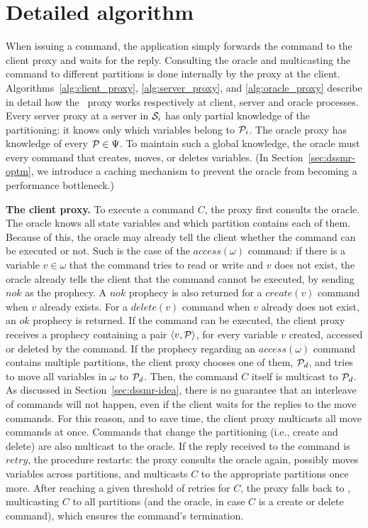 \section{Detailed algorithm}
\label{sec:dssmr-detail}


When issuing a command, the application simply forwards the command to the
client proxy and waits for the reply. Consulting the oracle and multicasting the
command to different partitions is done internally by the proxy at the client.
Algorithms~\ref{alg:client_proxy}, \ref{alg:server_proxy}, and
\ref{alg:oracle_proxy} describe in detail how the \dssmr\ proxy works
respectively at client, server and oracle processes. Every server proxy at a
server in $\mathcal{S}_i$ has only partial knowledge of the partitioning: it knows only
which variables belong to $\mathcal{P}_i$. The oracle proxy has knowledge of every
$\mathcal{P} \in \Psi$. To maintain such a global knowledge, the oracle must \amdel{}
every command that creates, moves, or deletes variables. (In
Section~\ref{sec:dssmr-optm}, we introduce a caching mechanism to prevent the oracle
from becoming a performance bottleneck.)



\textbf{The client proxy.} To execute a command $C$, the proxy first consults
the oracle. The oracle knows all state variables and which partition contains
each of them. Because of this, the oracle may already tell the client whether
the command can be executed or not. Such is the case of the $access(\omega)$
command: if there is a variable $v \in \omega$ that the command tries to read or
write and $v$ does not exist, the oracle already tells the client that the
command cannot be executed, by sending $nok$ as the prophecy. A $nok$ prophecy
is also returned for a $create(v)$ command when $v$ already exists. For a
$delete(v)$ command when $v$ already does not exist, an $ok$ prophecy is
returned. If the command can be executed, the client proxy receives a prophecy
containing a pair $\langle v, \mathcal{P} \rangle$, for every variable $v$ created,
accessed or deleted by the command. If the prophecy regarding an
$access(\omega)$ command contains multiple partitions, the client proxy chooses
one of them, $\mathcal{P}_d$, and tries to move all variables in $\omega$ to $\mathcal{P}_d$.
Then, the command $C$ itself is multicast to $\mathcal{P}_d$. As discussed in
Section~\ref{sec:dssmr-idea}, there is no guarantee that an interleave of
commands will not happen, even if the client waits for the replies to the move
commands. For this reason, and to save time, the client proxy multicasts all
move commands at once. Commands that change the partitioning (i.e., create and
delete) are also multicast to the oracle. If the reply received to the command
is $retry$, the procedure restarts: the proxy consults the oracle again,
possibly moves variables across partitions, and multicasts $C$ to the
appropriate partitions once more. After reaching a given threshold of retries
for $C$, the proxy falls back to \ssmr{}, multicasting $C$ to all partitions
(and the oracle, in case $C$ is a create or delete command), which ensures the
command's termination.

